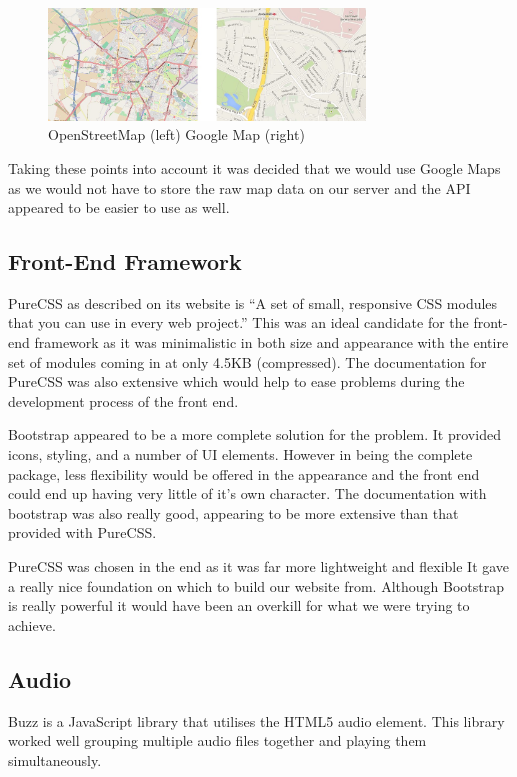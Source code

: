 \documentclass{l3proj}
\begin{document}
\begin{figure}[ht!]
  \centering
\includegraphics[width=0.75\textwidth]{images/openstreetmap_google-map.jpg}
\caption{OpenStreetMap (left) Google Map (right)}
\end{figure}

Taking these points into account it was decided that we would use Google Maps as we would not have to store the raw map data on our server and the API appeared to be easier to use as well.
 

\subsection{Front-End Framework}

PureCSS as described on its website is “A set of small, responsive CSS modules that you can use in every web project.” This was an ideal candidate for the front-end framework as it was minimalistic in both size and appearance with the entire set of modules coming in at only 4.5KB (compressed). The documentation for PureCSS was also extensive which would help to ease problems during the development process of the front end.

Bootstrap appeared to be a more complete solution for the problem. It provided icons, styling, and a number of UI elements. However in being the complete package, less flexibility would be offered in the appearance and the front end could end up having very little of it’s own character. The documentation with bootstrap was also really good, appearing to be more extensive than that provided with PureCSS.

PureCSS was chosen in the end as it was far more lightweight and flexible It gave a really nice foundation on which to build our website from. Although Bootstrap is really powerful it would have been an overkill for what we were trying to achieve.
 

\subsection{Audio}

Buzz is a JavaScript library that utilises the HTML5 audio element. This library worked well grouping multiple audio files together and playing them simultaneously.
\end{document}
